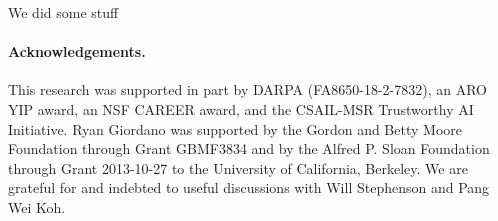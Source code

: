 We did some stuff

\paragraph{Acknowledgements.} This research was supported in part by DARPA
(FA8650-18-2-7832), an ARO YIP award, an NSF CAREER award, and the CSAIL-MSR
Trustworthy AI Initiative. Ryan Giordano was supported by the Gordon and Betty
Moore Foundation through Grant GBMF3834 and by the Alfred P. Sloan Foundation
through Grant 2013-10-27 to the University of California, Berkeley. We are
grateful for and indebted to useful discussions with Will Stephenson and Pang
Wei Koh.
